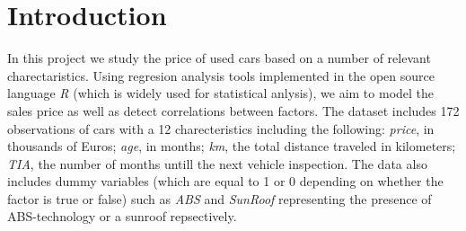 \section{Introduction}

In this project we study the price of used cars based on a number of relevant charectaristics. Using regresion analysis tools implemented in the open source language \textit{R} (which is widely used for statistical anlysis), we aim to model the sales price as well as detect correlations between factors. The dataset includes 172 observations of cars with a 12 charecteristics including the following: \textit{price}, in thousands of Euros; \textit{age}, in months; \textit{km}, the total distance traveled in kilometers; \textit{TIA}, the number of months untill the next vehicle inspection. The data also includes dummy variables (which are equal to 1 or 0 depending on whether the factor is true or false) such as \textit{ABS} and \textit{SunRoof} representing the presence of ABS-technology or a sunroof repsectively.